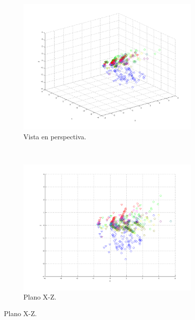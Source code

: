 \documentclass[informe.tex]{subfiles}
\begin{document}
      
	\begin{figure}[H]
        \centering
        \hspace*{-6.5cm}
        \begin{subfigure}[b]{0.49\textwidth}
                \includegraphics[width=\textwidth]{graficos/fold2_criterioParadao_reglaM_alpha0_rep1_0P.png}
                \caption{Vista en perspectiva.}
        \end{subfigure}%
        ~
        \begin{subfigure}[b]{0.49\textwidth}
                \includegraphics[width=\textwidth]{graficos/fold2_criterioParadao_reglaM_alpha0_rep1_1XZ.png}
                \caption{Plano X-Z.}
        \end{subfigure}
        

\end{figure}
\end{document}
